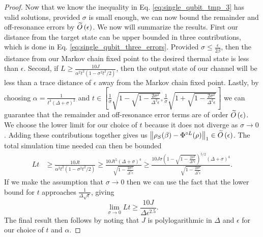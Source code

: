 \begin{proof}
Now that we know the inequality in Eq. \eqref{eq:single_qubit_tmp_3} has valid solutions, provided $\sigma$ is small enough, we can now bound the remainder and off-resonance errors by $\widetilde{O} \left( \epsilon \right)$. 
We now will summarize the results. First our distance from the target state can be upper bounded in three contributions, which is done in Eq. \eqref{eq:single_qubit_three_errors}.
Provided $\sigma \le \frac{\epsilon}{2 \beta}$, then the distance from our Markov chain fixed point to the desired thermal state is less than $\epsilon$. Second, if $L \ge \frac{10 J}{\alpha^2 t^2(1 - \sigma^2 t^2 /2) }$, then the output state of our channel will be less than a trace distance of $\epsilon$ away from the Markov chain fixed point. Lastly, by choosing $\alpha  = \frac{1}{t^3(\Delta + \sigma)^2}$ and $t \in \left[ \frac{1}{\sigma}\sqrt{1 - \sqrt{1 - \frac{2 \sigma^2}{\Delta^2 \epsilon}} }, \frac{1}{\sigma}\sqrt{1 + \sqrt{1 - \frac{2 \sigma^2}{\Delta^2 \epsilon}} } \right]$ we can guarantee that the remainder and off-resonance error terms are of order $\widetilde{O} \left( \epsilon \right)$.  We choose the lower limit for our choice of $t$ because it does not diverge as $\sigma\rightarrow 0$.  Adding these contributions together gives us $\norm{\rho_S(\beta) - \Phi^{\circ L }(\rho)}_1 \in \widetilde{O} \left( \epsilon \right)$. The total simulation time needed can then be bounded
\begin{align}
    Lt &\ge \frac{10 J t}{\alpha^2 t^2 (1 - \sigma^2 t^2 / 2)} \ge \frac{10 J t^5 (\Delta + \sigma)^4}{\sqrt{1 - \frac{2 \sigma^2}{\Delta^2 \epsilon}}} \ge \frac{10 J \sigma \left( 1 - \sqrt{1 - \frac{2 \sigma^2}{\Delta^2 \epsilon}}\right)^{5/2} (\Delta + \sigma)^4}{\sqrt{1 - \frac{2 \sigma^2}{\Delta^2 \epsilon}}}.
\end{align}
If we make the assumption that $\sigma \to 0$ then we can use the fact that the lower bound for $t$ approaches $\frac{1}{\Delta \sqrt{\epsilon}}$, giving
\begin{equation}
    \lim_{\sigma \to 0} Lt \ge \frac{10 J}{\Delta \epsilon^{2.5}}.
\end{equation}
The final result then follows by noting that $J$ is polylogarithmic in $\Delta$ and $\epsilon$ for our choice of $t$ and $\alpha$.
 \end{proof}


